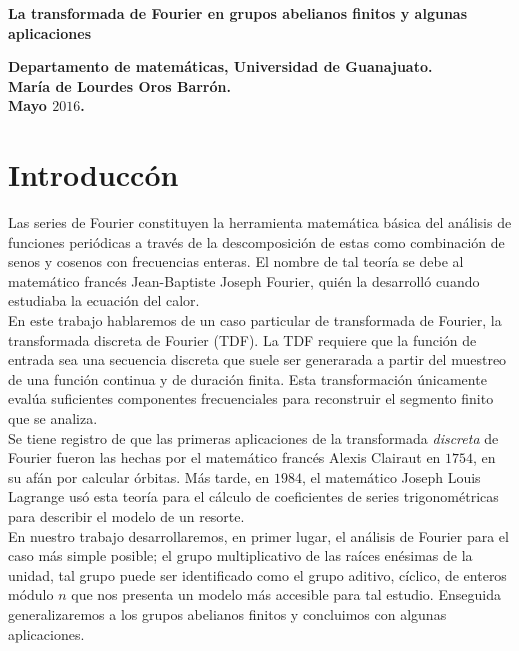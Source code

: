 \documentclass[a4paper,openright,10pt]{article}
\begin{document}
\pagestyle{empty}	
\begin{center}
	\begin{Huge}
		\textbf{La transformada de Fourier en grupos abelianos finitos y algunas aplicaciones}
	\end{Huge}
\end{center}
\begin{center}
\textbf{Departamento de matem\'aticas, Universidad de Guanajuato.}\\
\textbf{Mar\'ia de Lourdes Oros Barr\'on.}\\

\textbf{Mayo $2016$.}
\end{center}

\setcounter{secnumdepth}{4}

\section{Introducc\'on}
Las series de Fourier constituyen la herramienta matem\'atica b\'asica del an\'alisis de funciones peri\'odicas a trav\'es de la descomposici\'on de estas como combinaci\'on de senos y cosenos con frecuencias enteras. El nombre de tal teor\'ia se debe al matem\'atico franc\'es Jean-Baptiste Joseph Fourier, qui\'en la desarroll\'o cuando estudiaba la ecuaci\'on del calor. \\
En este trabajo hablaremos de un caso particular de transformada de Fourier, la transformada discreta de Fourier (TDF). La TDF requiere que la funci\'on de entrada sea una secuencia discreta que suele ser generarada a partir del muestreo de una funci\'on continua y de duraci\'on finita. Esta transformaci\'on \'unicamente eval\'ua suficientes componentes frecuenciales para reconstruir el segmento finito que se analiza. \\
Se tiene registro de que las primeras aplicaciones de la transformada \textit{discreta} de Fourier fueron las hechas por el matem\'atico franc\'es Alexis Clairaut en $1754$, en su af\'an por calcular \'orbitas. M\'as tarde, en $1984$, el matem\'atico Joseph Louis Lagrange us\'o esta teor\'ia para el c\'alculo de coeficientes de series trigonom\'etricas para describir el modelo de un resorte.\\
En nuestro trabajo desarrollaremos, en primer lugar, el an\'alisis de Fourier para el caso m\'as simple posible; el grupo multiplicativo de las ra\'ices en\'esimas de la unidad, tal grupo puede ser identificado como el grupo aditivo, c\'iclico, de enteros m\'odulo $n$ que nos presenta un modelo m\'as accesible para tal estudio. Enseguida generalizaremos a los grupos abelianos finitos y concluimos con algunas aplicaciones.\\
\end{document}
